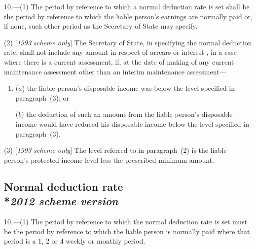 \documentclass[12pt,a4paper]{article}
\begin{document}
10.—(1) The period by reference to which 
a normal deduction rate  %
is set shall be the period by reference to which the liable person’s earnings are normally paid or, if none, such other period as the Secretary of State may specify.

(2) [\emph{1993 scheme only}] The Secretary of State, in specifying the normal deduction rate, shall not include any amount in respect of arrears or interest%
, in a case where there is a current assessment,  %
if, 
at the date of making of any current maintenance assessment other than an interim maintenance assessment---  %
\begin{enumerate}\item[]
($a$) the liable person’s disposable income was below the level specified in paragraph~(3); or

($b$) the deduction of such an amount from the liable person’s disposable income would have reduced his disposable income below the level specified in paragraph~(3).
\end{enumerate}

(3) [\emph{1993 scheme only}] The level referred to in paragraph~(2) is the liable person’s protected income level less the prescribed minimum amount.


\subsection[10. Normal deduction rate --- \emph{2012 scheme version}]{Normal deduction rate\\*\emph{2012 scheme version}}

10.---(1)  The period by reference to which the normal deduction rate is set must be the period by reference to which the liable person is normally paid where that period is a 1, 2 or 4 weekly or monthly period.
\end{document}

